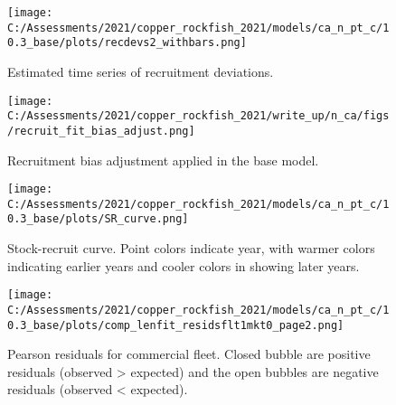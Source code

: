 \documentclass[11pt,
  english,
  a4paper,
]{article}
\begin{document}
\tagmcend\tagstructend


\begin{figure}
\centering
\texttt{[image: C:/Assessments/2021/copper\_rockfish\_2021/models/ca\_n\_pt\_c/10.3\_base/plots/recdevs2\_withbars.png]}
\caption{Estimated time series of recruitment deviations.\label{fig:rec-devs}}
\end{figure}

\tagmcend\tagstructend


\begin{figure}
\centering
\texttt{[image: C:/Assessments/2021/copper\_rockfish\_2021/write\_up/n\_ca/figs/recruit\_fit\_bias\_adjust.png]}
\caption{Recruitment bias adjustment applied in the base model.\label{fig:bias-adj}}
\end{figure}

\tagmcend\tagstructend


\begin{figure}
\centering
\texttt{[image: C:/Assessments/2021/copper\_rockfish\_2021/models/ca\_n\_pt\_c/10.3\_base/plots/SR\_curve.png]}
\caption{Stock-recruit curve. Point colors indicate year, with warmer colors indicating earlier years and cooler colors in showing later years.\label{fig:bh-curve}}
\end{figure}

\tagmcend\tagstructend


\begin{figure}
\centering
\texttt{[image: C:/Assessments/2021/copper\_rockfish\_2021/models/ca\_n\_pt\_c/10.3\_base/plots/comp\_lenfit\_residsflt1mkt0\_page2.png]}
\caption{Pearson residuals for commercial fleet. Closed bubble are positive residuals (observed \textgreater{} expected) and the open bubbles are negative residuals (observed \textless{} expected).\label{fig:com-pearson}}
\end{figure}

\tagmcend\tagstructend

\end{document}
